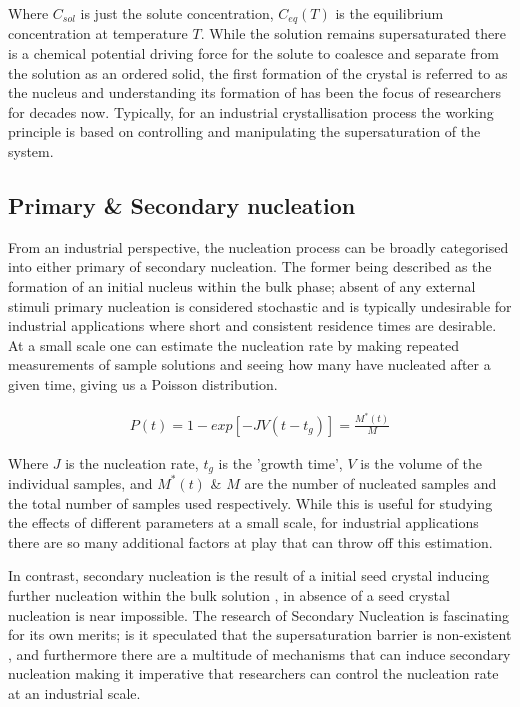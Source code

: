 Where $C_{sol}$ is just the solute concentration, $C_{eq}(T)$
is the equilibrium concentration at temperature $T$.
While the solution remains supersaturated there is a 
chemical potential driving force for the solute 
to coalesce and separate from the solution as an ordered solid, 
the first formation of the crystal is referred to as the 
nucleus and understanding its formation of has been the 
focus of researchers for decades now. Typically, for an 
industrial crystallisation process the working principle 
is based on controlling and manipulating the supersaturation
of the system. 

\subsection{Primary \& Secondary nucleation}
From an industrial perspective, the nucleation process can
be broadly categorised into either primary of secondary 
nucleation. The former being described as the formation of an
initial nucleus within the bulk phase; absent of any external
stimuli primary nucleation is considered stochastic and is typically
undesirable for industrial applications where short and consistent 
residence times are desirable. At a small scale one can estimate the 
nucleation rate by making repeated measurements of sample solutions 
and seeing how many have nucleated after a given time, giving us a 
Poisson distribution.

\begin{align}
	P(t) = 1 - exp\left[-JV(t-t_g)\right] = \frac{M^*(t)}{M}
\end{align}

Where $J$ is the nucleation rate, $t_g$ is the 'growth time', $V$
is the volume of the individual samples, and $M^*(t)$ \& $M$ are the 
number of nucleated samples and the total number of samples used respectively.
While this is useful for studying the effects of different parameters
at a small scale, for industrial applications there are so many
additional factors at play that can throw off this estimation.

In contrast, secondary nucleation is the result of a initial 
seed crystal inducing further nucleation within the bulk solution
\cite{Botsaris1976}, in absence of a seed crystal nucleation is
near impossible. The research of Secondary Nucleation is fascinating
for its own merits; is it speculated that the supersaturation 
barrier is non-existent \cite{Cashmore2022}, and furthermore there 
are a multitude of mechanisms that can induce secondary 
nucleation making it imperative that researchers can control the
nucleation rate at an industrial scale. 

